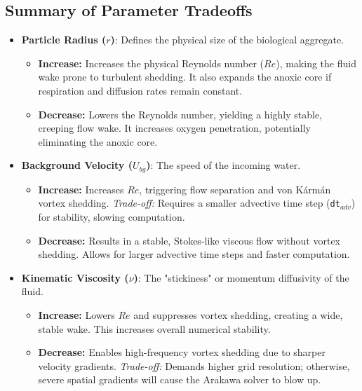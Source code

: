 \documentclass{article}
\begin{document}
\subsection{Summary of Parameter Tradeoffs}
\begin{itemize}
    \item \textbf{Particle Radius ($r$)}: Defines the physical size of the biological aggregate.
        \begin{itemize}
            \item \textbf{Increase:} Increases the physical Reynolds number ($Re$), making the fluid wake prone to turbulent shedding. It also expands the anoxic core if respiration and diffusion rates remain constant.
            \item \textbf{Decrease:} Lowers the Reynolds number, yielding a highly stable, creeping flow wake. It increases oxygen penetration, potentially eliminating the anoxic core.
        \end{itemize}

    \item \textbf{Background Velocity ($U_{bg}$)}: The speed of the incoming water.
        \begin{itemize}
            \item \textbf{Increase:} Increases $Re$, triggering flow separation and von Kármán vortex shedding. \textit{Trade-off:} Requires a smaller advective time step (\texttt{dt$_{adv}$}) for stability, slowing computation.
            \item \textbf{Decrease:} Results in a stable, Stokes-like viscous flow without vortex shedding. Allows for larger advective time steps and faster computation.
        \end{itemize}

    \item \textbf{Kinematic Viscosity ($\nu$)}: The "stickiness" or momentum diffusivity of the fluid.
        \begin{itemize}
            \item \textbf{Increase:} Lowers $Re$ and suppresses vortex shedding, creating a wide, stable wake. This increases overall numerical stability.
            \item \textbf{Decrease:} Enables high-frequency vortex shedding due to sharper velocity gradients. \textit{Trade-off:} Demands higher grid resolution; otherwise, severe spatial gradients will cause the Arakawa solver to blow up.
        \end{itemize}


\end{itemize}
\end{document}
